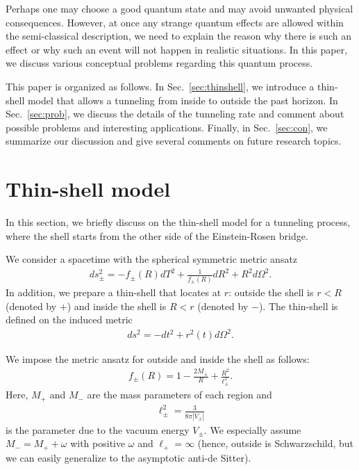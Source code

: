 \documentclass[preprintnumbers,10pt,nofootinbib]{revtex4}
\begin{document}
Perhaps one may choose a good quantum state and may avoid unwanted physical consequences. However, at once any strange quantum effects are allowed within the semi-classical description, we need to explain the reason why there is such an effect or why such an event will not happen in realistic situations. In this paper, we discuss various conceptual problems regarding this quantum process.

This paper is organized as follows. In Sec.~\ref{sec:thinshell}, we introduce a thin-shell model that allows a tunneling from inside to outside the past horizon. In Sec.~\ref{sec:prob}, we discuss the details of the tunneling rate and comment about possible problems and interesting applications. Finally, in Sec.~\ref{sec:con}, we summarize our discussion and give several comments on future research topics.

\section{\label{sec:thinshell}Thin-shell model}

In this section, we briefly discuss on the thin-shell model for a tunneling process, where the shell starts from the other side of the Einstein-Rosen bridge.

We consider a spacetime with the spherical symmetric metric ansatz
\begin{eqnarray}
\label{eq:metric}
ds_{\pm}^{2}= - f_{\pm}(R) dT^{2} + \frac{1}{f_{\pm}(R)} dR^{2} + R^{2} d\Omega^{2}.
\end{eqnarray}
In addition, we prepare a thin-shell that locates at $r$: outside the shell is $r < R$ (denoted by $+$) and inside the shell is $R < r$ (denoted by $-$). The thin-shell is defined on the induced metric
\begin{eqnarray}
ds^{2} = - dt^{2} + r^{2}(t) d\Omega^{2}.
\end{eqnarray}

We impose the metric ansatz for outside and inside the shell as follows:
\begin{eqnarray}
f_{\pm}(R) = 1 - \frac{2M_{\pm}}{R} + \frac{R^{2}}{\ell_{\pm}^{2}}.
\end{eqnarray}
Here, $M_{+}$ and $M_{-}$ are the mass parameters of each region and
\begin{eqnarray}
\ell^{2}_{\pm} = \frac{3}{8\pi |V_{\pm}|}
\end{eqnarray}
is the parameter due to the vacuum energy $V_{\pm}$. We especially assume $M_{-} = M_{+} + \omega$ with positive $\omega$ and $\ell_{+} = \infty$ (hence, outside is Schwarzschild, but we can easily generalize to the asymptotic anti-de Sitter).
\end{document}

